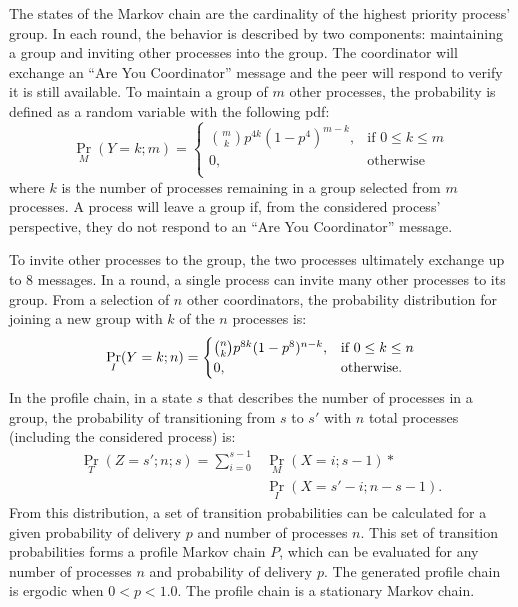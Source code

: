 The states of the Markov chain are the cardinality of the highest priority process' group.
In each round, the behavior is described by two components: maintaining a group and inviting other processes into the group.
The coordinator will exchange an ``Are You Coordinator'' message and the peer will respond to verify it is still available.
To maintain a group of $m$ other processes, the probability is defined as a random variable with the following \ac{pdf}:
\vspace{12pt}
\begin{equation}
 \Pr_{M}(Y=k; m) =
   \begin{cases}
    \binom{m}{k} p^{4k}(1-p^4)^{m-k}, & \text{if } 0 \leq k \leq m \\
    0,                                & \text{otherwise} \\
  \end{cases}
\end{equation}%
where $k$ is the number of processes remaining in a group selected from $m$ processes.
A process will leave a group if, from the considered process' perspective, they do not respond to an ``Are You Coordinator'' message.

To invite other processes to the group, the two processes ultimately exchange up to 8 messages.
In a round, a single process can invite many other processes to its group.
From a selection of $n$ other coordinators, the probability distribution for joining a new group with $k$ of the $n$ processes is:
\vspace{12pt}
\begin{equation}
    \Pr_{I}(Y=k; n) =
    \begin{cases}
        \binom{n}{k} p^{8k}(1-p^8)^{n-k}, & \text{if } 0 \leq k \leq n \\
        0,                                & \text{otherwise.} \\
    \end{cases}
\vspace{12pt}
\end{equation}
In the profile chain, in a state $s$ that describes the number of processes in a group, the probability of transitioning from $s$ to $s'$ with $n$ total processes (including the considered process) is:
\begin{align} \Pr_{T}(Z=s'; n; s) = \sum_{i=0}^{s-1} &\Pr_{M}(X=i; s-1) *
\nonumber \\ &\Pr_{I}(X=s'-i; n-s-1).\end{align}
From this distribution, a set of transition probabilities can be calculated for a given probability of delivery $p$ and number of processes $n$.
This set of transition probabilities forms a profile Markov chain $P$, which can be evaluated for any number of processes $n$ and probability of delivery $p$.
The generated profile chain is ergodic when $0<p<1.0$. The profile chain is a stationary Markov chain.

